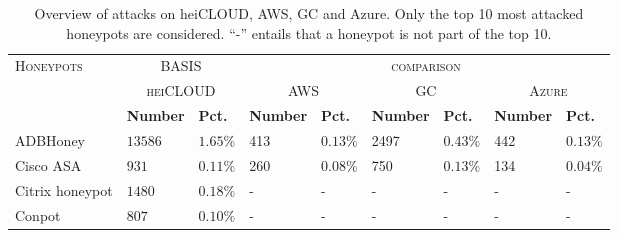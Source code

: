 \begin{table}
    \centering
    \caption[Overview of attacks on cloud providers]{Overview of attacks on heiCLOUD, AWS, GC and Azure. Only the top 10 most attacked honeypots are considered. \enquote{-} entails that a honeypot is not part of the top 10.}
    \begin{tabularx}{\linewidth}{l|XX|XX|XX|XX}
        \toprule
        \textsc{Honeypots}                        & \multicolumn{2}{c}{BASIS}             & \multicolumn{6}{c}{\textsc{comparison}}                                                                                                                                             \\
                                                  & \multicolumn{2}{c|}{\textsc{heiCLOUD}} & \multicolumn{2}{c|}{\textsc{AWS}}        & \multicolumn{2}{c|}{\textsc{GC}} & \multicolumn{2}{c}{\textsc{Azure}}                                                                     \\
                                                  & \textbf{Number}                        & \textbf{Pct.}                            & \textbf{Number}                  & \textbf{Pct.}                      & \textbf{Number} & \textbf{Pct.} & \textbf{Number} & \textbf{Pct.} \\
        \hline
        ADBHoney \cite{adbhoney2021}              & $13586$                                & $1.65\%$                                 & 413                              & $0.13\%$                           & 2497            & $0.43\%$      & 442             & $0.13\%$      \\
        Cisco ASA \cite{cymmetria2018}            & $931$                                  & $0.11\%$                                 & 260                              & $0.08\%$                           & 750             & $0.13\%$      & 134             & $0.04\%$      \\
        Citrix honeypot \cite{citrixhoneypot2020} & $1480$                                 & $0.18\%$                                 & -                                & -                                  & -               & -             & -               & -             \\
        Conpot \cite{conpot2021}                  & $807$                                  & $0.10\%$                                 & -                                & -                                  & -               & -             & -               & -             \\

\end{tabularx}
\end{table}
